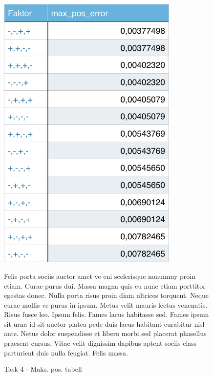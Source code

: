 	\begin{figure}
		\begin{minipage}{.5\textwidth}
			\centering
			\includegraphics[width=0.8\textwidth]{sections/Exercise4/task4max_pos_error.png}
		    	\caption{Task 4 - Maks. pos. tabell}
		    	\label{fig:task4max_pos_error}
		\end{minipage}
		\vspace{20 mm}
		\begin{minipage}{.5\textwidth}
			Felis porta sociis auctor amet ve eni scelerisque nonummy proin etiam. Curae purus dui. Massa magna quis eu nunc etiam porttitor egestas donec. Nulla porta risus proin diam ultrices torquent. Neque curae mollis ve purus in ipsum. Metus velit mauris lectus venenatis. Risus fusce leo. Ipsum felis. Fames lacus habitasse sed. Fames ipsum sit urna id sit auctor platea pede duis lacus habitant curabitur nisl ante. Netus dolor suspendisse et libero morbi sed placerat phasellus praesent cursus. Vitae velit dignissim dapibus aptent sociis class parturient duis nulla feugiat. Felis massa.
		\end{minipage}


\end{figure}
